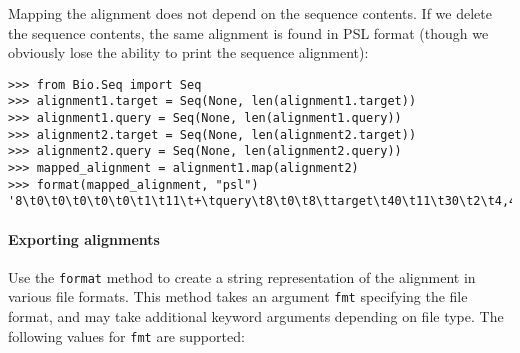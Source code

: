 Mapping the alignment does not depend on the sequence contents. If we delete
the sequence contents, the same alignment is found in PSL format (though we
obviously lose the ability to print the sequence alignment):

\begin{verbatim}
>>> from Bio.Seq import Seq
>>> alignment1.target = Seq(None, len(alignment1.target))
>>> alignment1.query = Seq(None, len(alignment1.query))
>>> alignment2.target = Seq(None, len(alignment2.target))
>>> alignment2.query = Seq(None, len(alignment2.query))
>>> mapped_alignment = alignment1.map(alignment2)
>>> format(mapped_alignment, "psl")
'8\t0\t0\t0\t0\t0\t1\t11\t+\tquery\t8\t0\t8\ttarget\t40\t11\t30\t2\t4,4,\t0,4,\t11,26,\n'
\end{verbatim}

\paragraph*{Exporting alignments}

Use the \verb+format+ method to create a string representation of the alignment in various file formats. This method takes an argument \verb+fmt+ specifying the file format, and may take additional keyword arguments depending on file type. The following values for \verb+fmt+ are supported:

